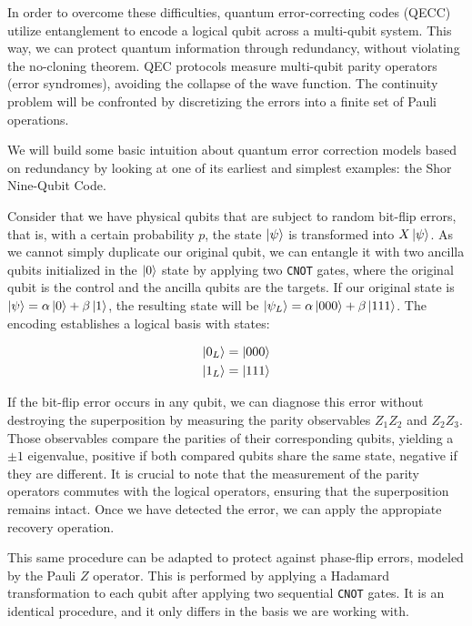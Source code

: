 \documentclass[12pt, twoside, openany]{book}
\begin{document}
In order to overcome these difficulties, quantum error-correcting codes (QECC) utilize entanglement to encode a logical qubit across a multi-qubit system. This way, we can protect quantum information through redundancy, without violating the no-cloning theorem. QEC protocols measure multi-qubit parity operators (error syndromes), avoiding the collapse of the wave function. The continuity problem will be confronted by discretizing the errors into a finite set of Pauli operations.

We will build some basic intuition about quantum error correction models based on redundancy by looking at one of its earliest and simplest examples: the Shor Nine-Qubit Code. 

Consider that we have physical qubits that are subject to random bit-flip errors, that is, with a certain probability $p$, the state $\ket{ \psi }$ is transformed into $X \ket{ \psi }$. As we cannot simply duplicate our original qubit, we can entangle it with two ancilla qubits initialized in the $\ket{0}$ state by applying two \texttt{CNOT} gates, where the original qubit is the control and the ancilla qubits are the targets. If our original state is $\ket{ \psi } = \alpha \ket{0} + \beta \ket{1}$, the resulting state will be $\ket{ \psi_L } = \alpha \ket{000} + \beta \ket{111}$. The encoding establishes a logical basis with states: 

\begin{align*}
    \ket{0_L} = \ket{000} \\
    \ket{1_L} = \ket{111}
\end{align*}

If the bit-flip error occurs in any qubit, we can diagnose this error without destroying the superposition by measuring the parity observables $Z_1 Z_2$ and $Z_2 Z_3$. Those observables compare the parities of their corresponding qubits, yielding a $\pm 1$ eigenvalue, positive if both compared qubits share the same state, negative if they are different. It is crucial to note that the measurement of the parity operators commutes with the logical operators, ensuring that the superposition remains intact. Once we have detected the error, we can apply the appropiate recovery operation. 

This same procedure can be adapted to protect against phase-flip errors, modeled by the Pauli $Z$ operator. This is performed by applying a Hadamard transformation to each qubit after applying two sequential \texttt{CNOT} gates. It is an identical procedure, and it only differs in the basis we are working with. 
\end{document}
